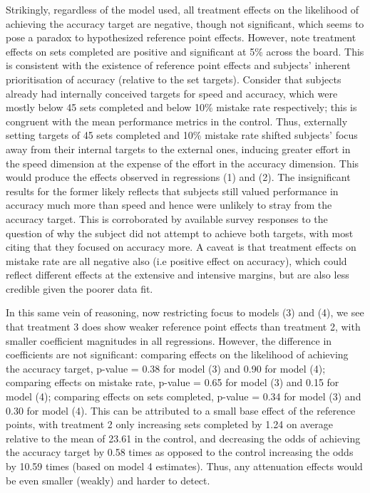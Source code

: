 \documentclass[12pt, letterpaper]{article}
\begin{document}
Strikingly, regardless of the model used, all treatment effects on the likelihood of achieving the accuracy target are negative, though not significant, which seems to pose a paradox to hypothesized reference point effects. However, note treatment effects on sets completed are positive and significant at 5\% across the board. This is consistent with the existence of reference point effects and subjects' inherent prioritisation of accuracy (relative to the set targets). Consider that subjects already had internally conceived targets for speed and accuracy, which were mostly below 45 sets completed and below 10\% mistake rate respectively; this is congruent with the mean performance metrics in the control. Thus, externally setting targets of 45 sets completed and 10\% mistake rate shifted subjects' focus away from their internal targets to the external ones, inducing greater effort in the speed dimension at the expense of the effort in the accuracy dimension. This would produce the effects observed in regressions (1) and (2). The insignificant results for the former likely reflects that subjects still valued performance in accuracy much more than speed and hence were unlikely to stray from the accuracy target. This is corroborated by available survey responses to the question of why the subject did not attempt to achieve both targets, with most citing that they focused on accuracy more. A caveat is that treatment effects on mistake rate are all negative also (i.e positive effect on accuracy), which could reflect different effects at the extensive and intensive margins, but are also less credible given the poorer data fit.

In this same vein of reasoning, now restricting focus to models (3) and (4), we see that treatment 3 does show weaker reference point effects than treatment 2, with smaller coefficient magnitudes in all regressions. However, the difference in coefficients are not significant: comparing effects on the likelihood of achieving the accuracy target, p-value = 0.38 for model (3) and 0.90 for model (4); comparing effects on mistake rate, p-value = 0.65 for model (3) and 0.15 for model (4); comparing effects on sets completed, p-value = 0.34 for model (3) and 0.30 for model (4). This can be attributed to a small base effect of the reference points, with treatment 2 only increasing sets completed by 1.24 on average relative to the mean of 23.61 in the control, and decreasing the odds of achieving the accuracy target by 0.58 times as opposed to the control increasing the odds by 10.59 times (based on model 4 estimates). Thus, any attenuation effects would be even smaller (weakly) and harder to detect.
\end{document}
